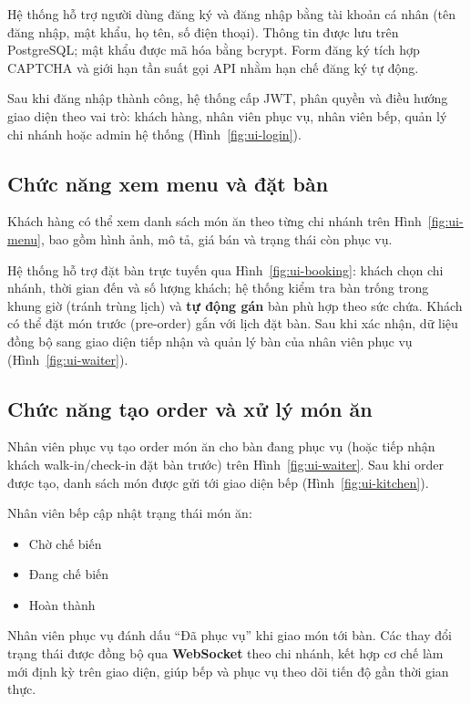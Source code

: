\documentclass[../DoAn.tex]{subfiles}
\begin{document}
Hệ thống hỗ trợ người dùng đăng ký và đăng nhập bằng tài khoản cá nhân (tên đăng nhập, mật khẩu, họ tên, số điện thoại).
Thông tin được lưu trên PostgreSQL; mật khẩu được mã hóa bằng bcrypt.
Form đăng ký tích hợp CAPTCHA và giới hạn tần suất gọi API nhằm hạn chế đăng ký tự động.

Sau khi đăng nhập thành công, hệ thống cấp JWT, phân quyền và điều hướng giao diện theo vai trò: khách hàng, nhân viên phục vụ, nhân viên bếp, quản lý chi nhánh hoặc admin hệ thống (Hình~\ref{fig:ui-login}).

\subsection{Chức năng xem menu và đặt bàn}

Khách hàng có thể xem danh sách món ăn theo từng chi nhánh trên Hình~\ref{fig:ui-menu}, bao gồm hình ảnh, mô tả, giá bán và trạng thái còn phục vụ.

Hệ thống hỗ trợ đặt bàn trực tuyến qua Hình~\ref{fig:ui-booking}: khách chọn chi nhánh, thời gian đến và số lượng khách;
hệ thống kiểm tra bàn trống trong khung giờ (tránh trùng lịch) và \textbf{tự động gán} bàn phù hợp theo sức chứa.
Khách có thể đặt món trước (pre-order) gắn với lịch đặt bàn.
Sau khi xác nhận, dữ liệu đồng bộ sang giao diện tiếp nhận và quản lý bàn của nhân viên phục vụ (Hình~\ref{fig:ui-waiter}).

\subsection{Chức năng tạo order và xử lý món ăn}

Nhân viên phục vụ tạo order món ăn cho bàn đang phục vụ (hoặc tiếp nhận khách walk-in/check-in đặt bàn trước) trên Hình~\ref{fig:ui-waiter}.
Sau khi order được tạo, danh sách món được gửi tới giao diện bếp (Hình~\ref{fig:ui-kitchen}).

Nhân viên bếp cập nhật trạng thái món ăn:
\begin{itemize}
    \item Chờ chế biến
    \item Đang chế biến
    \item Hoàn thành
\end{itemize}

Nhân viên phục vụ đánh dấu ``Đã phục vụ'' khi giao món tới bàn.
Các thay đổi trạng thái được đồng bộ qua \textbf{WebSocket} theo chi nhánh, kết hợp cơ chế làm mới định kỳ trên giao diện, giúp bếp và phục vụ theo dõi tiến độ gần thời gian thực.
\end{document}
